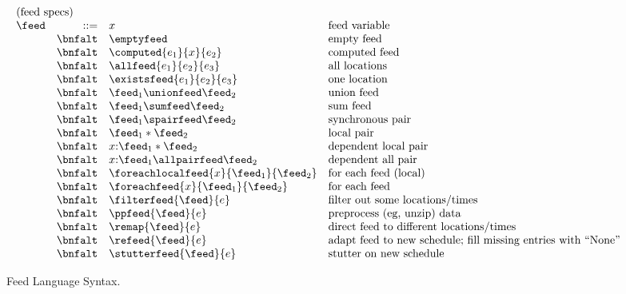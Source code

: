 \begin{figure*}[t]
\[
\begin{array}{lrll}
\multicolumn{4}{l}{\mbox{(feed specs)}}\\ 
\feed & ::=     & x &  \mbox{feed variable} \\
 & \bnfalt & \emptyfeed & \mbox{empty feed} \\
 & \bnfalt & \computed{e_1}{x}{e_2} & \mbox{computed feed} \\
 & \bnfalt & \allfeed{e_1}{e_2}{e_3} & \mbox{all locations} \\
 & \bnfalt & \existsfeed{e_1}{e_2}{e_3} & \mbox{one location} \\
 & \bnfalt & \feed_1 \unionfeed \feed_2 & \mbox{union feed} \\
 & \bnfalt & \feed_1 \sumfeed \feed_2 & \mbox{sum feed} \\
 & \bnfalt & \feed_1 \spairfeed \feed_2 & \mbox{synchronous pair} \\
 & \bnfalt & \feed_1 * \feed_2 & \mbox{local pair} \\
 & \bnfalt & x{:}\feed_1 * \feed_2 & \mbox{dependent local pair} \\
 & \bnfalt & x{:}\feed_1 \allpairfeed \feed_2 & \mbox{dependent all pair} \\
 & \bnfalt & \foreachlocalfeed{x}{\feed_1}{\feed_2} & \mbox{for each feed (local)} \\
 & \bnfalt & \foreachfeed{x}{\feed_1}{\feed_2} & \mbox{for each feed} \\
 & \bnfalt & \filterfeed{\feed}{e} & \mbox{filter out some locations/times} \\
 & \bnfalt & \ppfeed{\feed}{e} & \mbox{preprocess (eg, unzip) data} \\
 & \bnfalt & \remap{\feed}{e} & \mbox{direct feed to different locations/times} \\
 & \bnfalt & \refeed{\feed}{e} & \mbox{adapt feed to new schedule; 
                                               fill missing entries with ``None''} \\
 & \bnfalt & \stutterfeed{\feed}{e} & \mbox{stutter on new schedule} \\

\end{array}
\]
\caption{Feed Language Syntax.}
\label{fig:syntax}
\end{figure*}


